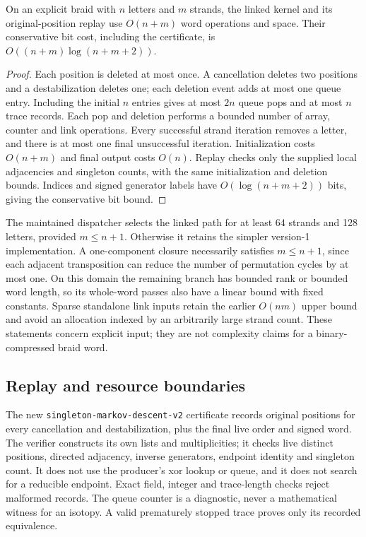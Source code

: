\begin{proposition}
On an explicit braid with $n$ letters and $m$ strands, the linked kernel and
its original-position replay use $O(n+m)$ word operations and space. Their
conservative bit cost, including the certificate, is
$O((n+m)\log(n+m+2))$.
\end{proposition}
\begin{proof}
Each position is deleted at most once. A cancellation deletes two positions
and a destabilization deletes one; each deletion event adds at most one queue
entry. Including the initial $n$ entries gives at most $2n$ queue pops and
at most $n$ trace records. Each pop and deletion performs a bounded number
of array, counter and link operations. Every successful strand iteration
removes a letter, and there is at most one final unsuccessful iteration.
Initialization costs $O(n+m)$ and final output costs $O(n)$. Replay checks
only the supplied local adjacencies and singleton counts, with the same
initialization and deletion bounds. Indices and signed generator labels
have $O(\log(n+m+2))$ bits, giving the conservative bit bound.
\end{proof}

The maintained dispatcher selects the linked path for at least 64 strands
and 128 letters, provided $m\le n+1$. Otherwise it retains the simpler
version-1 implementation. A one-component closure necessarily satisfies
$m\le n+1$, since each adjacent transposition can reduce the number of
permutation cycles by at most one. On this domain the remaining branch has
bounded rank or bounded word length, so its whole-word passes also have a
linear bound with fixed constants. Sparse standalone link inputs retain
the earlier $O(nm)$ upper bound and avoid an allocation indexed by an
arbitrarily large strand count. These statements concern explicit input;
they are not complexity claims for a binary-compressed braid word.

\subsection{Replay and resource boundaries}

The new \texttt{singleton-markov-descent-v2} certificate records original
positions for every cancellation and destabilization, plus the final live
order and signed word. The verifier constructs its own lists and multiplicities;
it checks live distinct positions, directed adjacency, inverse generators,
endpoint identity and singleton count. It does not use the producer's xor
lookup or queue, and it does not search for a reducible endpoint. Exact
field, integer and trace-length checks reject malformed records. The queue
counter is a diagnostic, never a mathematical witness for an isotopy.
A valid prematurely stopped trace proves only its recorded equivalence.

